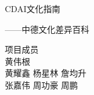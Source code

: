 \documentclass[12pt, notitlepage]{ctexbook}
\begin{document}
	\pagestyle{plain}
	
	\cleardoublepage
	\thispagestyle{empty}
	\begin{titlepage}
	\centering
	\vspace*{6cm}
	\noindent
	\center
	\begin{minipage}{0.7\linewidth}
	\heiti CDAI文化指南\par
	\vspace{12pt}
	\songti ——中德文化差异百科\par
	\vspace{8cm}
	\dinprolight{}
	\raggedright
	项目成员\\
	
	黄伟根\\
	黄耀鑫 \hspace{1em} 杨星林 \hspace{1em} 詹均升 \\
	张嘉伟 \hspace{1em} 周功豪 \hspace{1em} 周鹏 \\
	\end{minipage}
	\end{titlepage}

	\cleardoublepage
	

	\tableofcontents
	\cleardoublepage
	\pagestyle{headings}	
	
	
	
\end{document}
